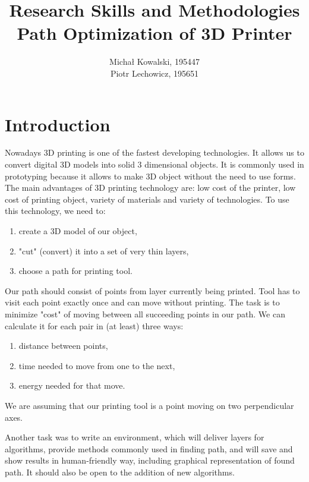 \documentclass[titlepage]{article}
\title{Research Skills and Methodologies\\Path Optimization of 3D Printer}
\author{Michał Kowalski, 195447\\Piotr Lechowicz, 195651}
\date{}
\begin{document}
\maketitle

\tableofcontents
\newpage

\section{Introduction}
Nowadays 3D printing is one of the fastest developing technologies. It allows us to convert digital 3D models into solid 3 dimensional objects. It is commonly used in prototyping because it allows to make 3D object without the need to use forms. The main advantages of 3D printing technology are: low cost of the printer, low cost of printing object, variety of materials and variety of technologies.
To use this technology, we need to:
\begin{enumerate}
\item create a 3D model of our object,
\item "cut" (convert) it into a set of very thin layers,
\item choose a path for printing tool.
\end{enumerate}
Our path should consist of points from layer currently being printed. Tool has to visit each point exactly once and can move without printing. The task is to minimize "cost" of moving between all succeeding points in our path. We can calculate it for each pair in (at least) three ways:
\begin{enumerate}
\item distance between points,
\item time needed to move from one to the next,
\item energy needed for that move.
\end{enumerate}
We are assuming that our printing tool is a point moving on two perpendicular axes.

Another task was to write an environment, which will deliver layers for algorithms, provide methods commonly used in finding path, and will save and show results in human-friendly way, including graphical representation of found path. It should also be open to the addition of new algorithms.

\pagebreak
\end{document}
